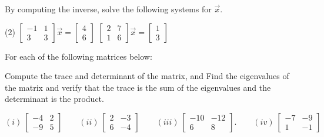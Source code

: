 \begin{exercise}\ansMark%
By computing the inverse,
solve the following systems for $\vec{x}$.
\begin{tasks}(2)
\task
$\begin{bmatrix}
-1 & 1 \\
3 & 3
\end{bmatrix} \vec{x} =
\begin{bmatrix} 4 \\ 6 \end{bmatrix}$
\task
$\begin{bmatrix}
2 & 7 \\
1 & 6
\end{bmatrix} \vec{x} =
\begin{bmatrix} 1 \\ 3 \end{bmatrix}$
\end{tasks}
\end{exercise}

\begin{exercise}\ansMark%
For each of the following matrices below:
\begin{tasks}
\task Compute the trace and determinant of the matrix, and
\task Find the eigenvalues of the matrix and verify that the trace is the sum of the eigenvalues and the determinant is the product. 
\end{tasks}
\begin{equation*}
(i) \ \begin{bmatrix} -4 & 2 \\ -9 & 5 \end{bmatrix} \qquad (ii) \ \begin{bmatrix} 2 & -3 \\ 6 & -4 \end{bmatrix} \qquad (iii)  \ \begin{bmatrix} -10& -12 \\ 6 & 8\end{bmatrix}. \qquad (iv) \ \begin{bmatrix} -7 & -9 \\ 1 & -1 \end{bmatrix}
\end{equation*}
\end{exercise}
%

